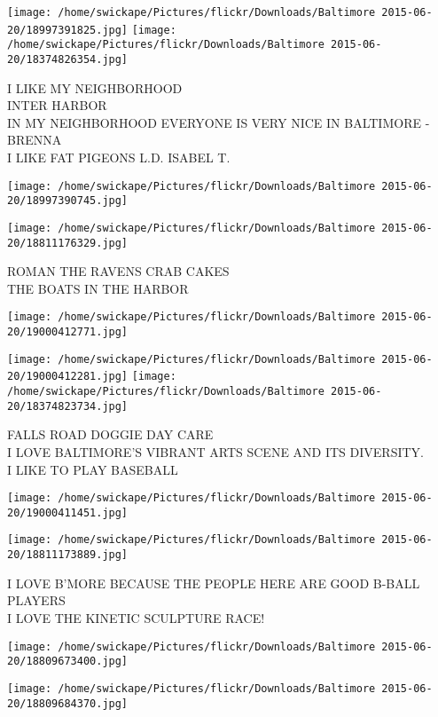 \documentclass[10pt,letterpaper]{article}
\begin{document}
\texttt{[image: /home/swickape/Pictures/flickr/Downloads/Baltimore 2015-06-20/18997391825.jpg]}
\texttt{[image: /home/swickape/Pictures/flickr/Downloads/Baltimore 2015-06-20/18374826354.jpg]}

I LIKE MY NEIGHBORHOOD\\
INTER HARBOR\\
IN MY NEIGHBORHOOD EVERYONE IS VERY NICE IN BALTIMORE {-} BRENNA\\
I LIKE FAT PIGEONS L.D. ISABEL T.
\pagebreak

\texttt{[image: /home/swickape/Pictures/flickr/Downloads/Baltimore 2015-06-20/18997390745.jpg]}

\vspace{0.25in}
\texttt{[image: /home/swickape/Pictures/flickr/Downloads/Baltimore 2015-06-20/18811176329.jpg]}

ROMAN THE RAVENS CRAB CAKES\\
THE BOATS IN THE HARBOR
\pagebreak

\texttt{[image: /home/swickape/Pictures/flickr/Downloads/Baltimore 2015-06-20/19000412771.jpg]}

\vspace{0.25in}
\texttt{[image: /home/swickape/Pictures/flickr/Downloads/Baltimore 2015-06-20/19000412281.jpg]}
\texttt{[image: /home/swickape/Pictures/flickr/Downloads/Baltimore 2015-06-20/18374823734.jpg]}

FALLS ROAD DOGGIE DAY CARE\\
I LOVE BALTIMORE'S VIBRANT ARTS SCENE AND ITS DIVERSITY.\\
I LIKE TO PLAY BASEBALL
\pagebreak

\texttt{[image: /home/swickape/Pictures/flickr/Downloads/Baltimore 2015-06-20/19000411451.jpg]}

\vspace{0.25in}
\texttt{[image: /home/swickape/Pictures/flickr/Downloads/Baltimore 2015-06-20/18811173889.jpg]}

I LOVE B'MORE BECAUSE THE PEOPLE HERE ARE GOOD B{-}BALL PLAYERS\\
I LOVE THE KINETIC SCULPTURE RACE!
\pagebreak

\texttt{[image: /home/swickape/Pictures/flickr/Downloads/Baltimore 2015-06-20/18809673400.jpg]}

\vspace{0.25in}
\texttt{[image: /home/swickape/Pictures/flickr/Downloads/Baltimore 2015-06-20/18809684370.jpg]}
\end{document}
